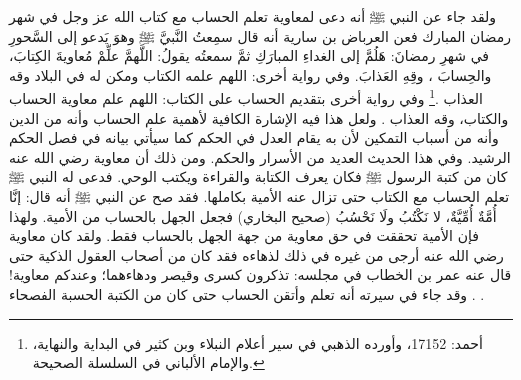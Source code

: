 ولقد جاء عن النبي ﷺ أنه دعى لمعاوية تعلم الحساب مع كتاب الله عز وجل في شهر رمضان المبارك فعن العرباض بن سارية أنه قال سمِعتُ النَّبيَّ ﷺ وهوَ يَدعو إلى السَّحورِ في شهرِ رمضانَ: هَلُمَّ إلى الغداءِ المبارَكِ ثمَّ سمعتُه يقولُ: اللَّهمَّ علِّمْ مُعاويةَ الكِتابَ، والحِسابَ ، وقِهِ العَذابَ. وفي رواية أخرى: اللهم علمه الكتاب ومكن له في البلاد وقه العذاب \href{https://shamela.ws/book/25794/13683#p2}{\faExternalLink}\href{https://shamela.ws/book/22669/1909#p2}{\faExternalLink}\href{https://shamela.ws/book/4445/6628#p1}{\faExternalLink}\href{https://shamela.ws/book/9442/5496#p12}{\faExternalLink} \cite{ahmid}\cite{dahabi_Siyar}\cite{ibnKathir_AlBidayah}\cite{albani_Sahiha}.\footnote{أحمد: 17152، وأورده الذهبي في سير أعلام النبلاء وبن كثير في البداية والنهاية، والإمام الألباني في السلسلة الصحيحة.} وفي رواية أخرى بتقديم الحساب على الكتاب: اللهم علم معاوية الحساب والكتاب، وقه العذاب \href{https://shamela.ws/book/20879/1060#p1}{\faExternalLink}\href{https://shamela.ws/book/23100/2493#p1}{\faExternalLink}. ولعل هذا فيه الإشارة الكافية لأهمية علم الحساب وأنه من الدين وأنه من أسباب التمكين لأن به يقام العدل في الحكم كما سيأتي بيانه في فصل الحكم الرشيد. وفي هذا الحديث العديد من الأسرار والحكم. ومن ذلك أن معاوية رضي الله عنه كان من كتبة الرسول ﷺ فكان يعرف الكتابة والقراءة ويكتب الوحي. فدعى له النبي ﷺ تعلم الحساب مع الكتاب حتى تزال عنه الأمية بكاملها. فقد صح عن النبي ﷺ أنه قال: إنَّا أُمَّةٌ أُمِّيَّةٌ، لا نَكْتُبُ ولَا نَحْسُبُ {\footnotesize (صحيح البخاري)} فجعل الجهل بالحساب من الأمية. ولهذا فإن الأمية تحققت في حق معاوية من جهة الجهل بالحساب فقط. ولقد كان معاوية رضي الله عنه أرجى من غيره في ذلك لذهاءه فقد كان من أصحاب العقول الذكية حتى قال عنه عمر بن الخطاب في مجلسه: تذكرون كسرى وقيصر ودهاءهما؛ وعندكم معاوية! \href{https://shamela.ws/book/9783/2790#p3}{\faExternalLink} \cite{ibnJareerTabari_Tareekh}. وقد جاء في سيرته أنه تعلم وأتقن الحساب حتى كان من الكتبة الحسبة الفصحاء \href{https://shamela.ws/book/12286/6715#p6}{\faExternalLink} \href{https://shamela.ws/book/7299/5215#p3}{\faExternalLink}. 


